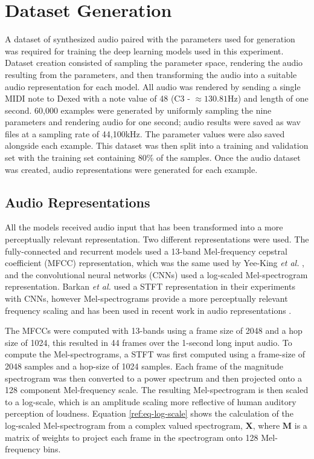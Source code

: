 \section{Dataset Generation}
\label{sec:dataset-generation}

A dataset of synthesized audio paired with the parameters used for generation was required for training the deep learning models used in this experiment. Dataset creation consisted of sampling the parameter space, rendering the audio resulting from the parameters, and then transforming the audio into a suitable audio representation for each model. All audio was rendered by sending a single MIDI note to Dexed with a note value of 48 (C3 - $\approx 130.81$Hz) and length of one second. 60,000 examples were generated by uniformly sampling the nine parameters and rendering audio for one second; audio results were saved as wav files at a sampling rate of 44,100kHz. The parameter values were also saved alongside each example. This dataset was then split into a training and validation set with the training set containing 80\% of the samples. Once the audio dataset was created, audio representations were generated for each example.

\subsection{Audio Representations}
All the models received audio input that has been transformed into a more perceptually relevant representation. Two different representations were used. The fully-connected and recurrent models used a 13-band Mel-frequency cepstral coefficient (MFCC) representation, which was the same used by Yee-King \textit{et al.} \cite{yee2018automatic}, and the convolutional neural networks (CNNs) used a log-scaled Mel-spectrogram representation. Barkan \textit{et al.} \cite{barkan2019inversynth} used a STFT representation in their experiments with CNNs, however Mel-spectrograms provide a more perceptually relevant frequency scaling and has been used in recent work in audio representations \cite{cramer:learnmore:icassp:19, hershey2017cnn}.

The MFCCs were computed with 13-bands using a frame size of 2048 and a hop size of 1024, this resulted in 44 frames over the 1-second long input audio. To compute the Mel-spectrograms, a STFT was first computed using a frame-size of 2048 samples and a hop-size of 1024 samples. Each frame of the magnitude spectrogram was then converted to a power spectrum and then projected onto a 128 component Mel-frequency scale. The resulting Mel-spectrogram is then scaled to a log-scale, which is an amplitude scaling more reflective of human auditory perception of loudness. Equation \ref{ref:eq-log-scale} shows the calculation of the log-scaled Mel-spectrogram from a complex valued spectrogram, $\textbf{X}$, where $\textbf{M}$ is a matrix of weights to project each frame in the spectrogram onto 128 Mel-frequency bins.

